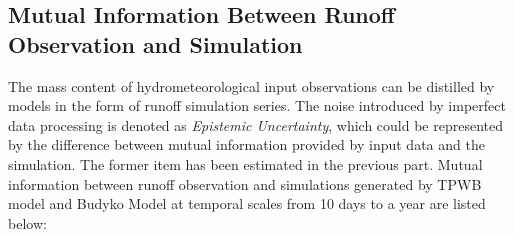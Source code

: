\documentclass[review]{elsarticle}
\begin{document}

\subsection{Mutual Information Between Runoff Observation and Simulation}
The mass content of hydrometeorological input observations can be distilled by models in the form of runoff simulation series. The noise introduced by imperfect data processing is denoted as \emph{Epistemic Uncertainty}, which could be represented by the difference between  mutual information provided by input data and  the simulation. The former item has been estimated in the previous part. Mutual information between runoff observation and simulations  generated by TPWB model and Budyko Model at temporal scales from 10 days to a year are listed below: 
\end{document}
